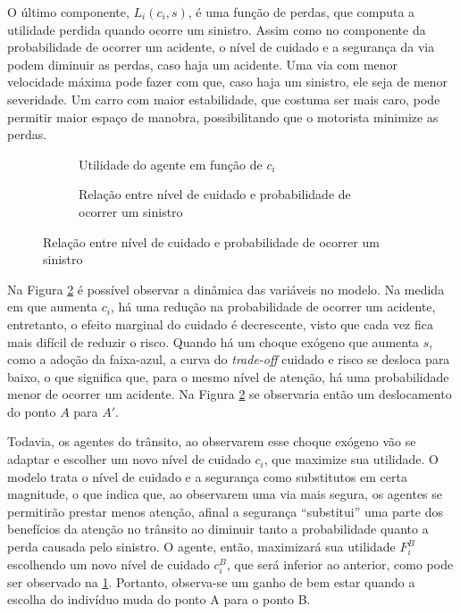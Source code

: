 O último componente, $L_i(c_i,s)$, é uma função de perdas, que computa a utilidade perdida quando ocorre um sinistro. Assim como no componente da probabilidade de ocorrer um acidente, o nível de cuidado e a segurança da via podem diminuir as perdas, caso haja um acidente. Uma via com menor velocidade máxima pode fazer com que, caso haja um sinistro, ele seja de menor severidade. Um carro com maior estabilidade, que costuma ser mais caro, pode permitir maior espaço de manobra, possibilitando que o motorista minimize as perdas.

\begin{figure}
    \caption{Estática comparativa do modelo microeconômico}
    \begin{subfigure}[t]{0.45\linewidth}
        \centering
        
        \caption{Utilidade do agente em função de $c_i$}
        \label{fig:micro1}
    \end{subfigure}
    \hfill
    \begin{subfigure}[t]{0.45\linewidth}
        \centering
        
        \caption{Relação entre nível de cuidado e probabilidade de ocorrer um sinistro}
        \label{fig:micro3}
    \end{subfigure}
    \label{fig:micro}
\end{figure}

Na Figura \ref{fig:micro3} é possível observar a dinâmica das variáveis no modelo. Na medida em que aumenta $c_i$, há uma redução na probabilidade de ocorrer um acidente, entretanto, o efeito marginal do cuidado é decrescente, visto que cada vez fica mais difícil de reduzir o risco. Quando há um choque exógeno que aumenta $s$, como a adoção da faixa-azul, a curva do \textit{trade-off} cuidado e risco se desloca para baixo, o que significa que, para o mesmo nível de atenção, há uma probabilidade menor de ocorrer um acidente. Na Figura \ref{fig:micro3} se observaria então um deslocamento do ponto $A$ para $A'$.

Todavia, os agentes do trânsito, ao observarem esse choque exógeno vão se adaptar e escolher um novo nível de cuidado $c_i$, que maximize sua utilidade. O modelo trata o nível de cuidado e a segurança como substitutos em certa magnitude, o que indica que, ao observarem uma via mais segura, os agentes se permitirão prestar menos atenção, afinal a segurança ``substitui'' uma parte dos benefícios da atenção no trânsito ao diminuir tanto a probabilidade quanto a perda causada pelo sinistro. O agente, então, maximizará sua utilidade $F_i^B$ escolhendo um novo nível de cuidado $c_i^B$, que será inferior ao anterior, como pode ser observado na \ref{fig:micro1}. Portanto, observa-se um ganho de bem estar quando a escolha do indivíduo muda do ponto A para o ponto B.

